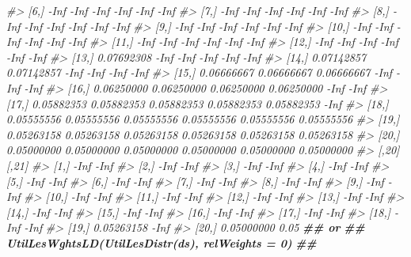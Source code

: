 \documentclass[
]{book}
\newenvironment{Shaded}{\begin{snugshade}}{\end{snugshade}}
\newcommand{\CommentTok}[1]{\textcolor[rgb]{0.56,0.35,0.01}{\textit{#1}}}
\newcommand{\DocumentationTok}[1]{\textcolor[rgb]{0.56,0.35,0.01}{\textbf{\textit{#1}}}}
\begin{document}
\begin{Shaded}
\begin{Highlighting}[]
\CommentTok{\#\textgreater{}  [6,]       {-}Inf       {-}Inf       {-}Inf       {-}Inf       {-}Inf       {-}Inf}
\CommentTok{\#\textgreater{}  [7,]       {-}Inf       {-}Inf       {-}Inf       {-}Inf       {-}Inf       {-}Inf}
\CommentTok{\#\textgreater{}  [8,]       {-}Inf       {-}Inf       {-}Inf       {-}Inf       {-}Inf       {-}Inf}
\CommentTok{\#\textgreater{}  [9,]       {-}Inf       {-}Inf       {-}Inf       {-}Inf       {-}Inf       {-}Inf}
\CommentTok{\#\textgreater{} [10,]       {-}Inf       {-}Inf       {-}Inf       {-}Inf       {-}Inf       {-}Inf}
\CommentTok{\#\textgreater{} [11,]       {-}Inf       {-}Inf       {-}Inf       {-}Inf       {-}Inf       {-}Inf}
\CommentTok{\#\textgreater{} [12,]       {-}Inf       {-}Inf       {-}Inf       {-}Inf       {-}Inf       {-}Inf}
\CommentTok{\#\textgreater{} [13,] 0.07692308       {-}Inf       {-}Inf       {-}Inf       {-}Inf       {-}Inf}
\CommentTok{\#\textgreater{} [14,] 0.07142857 0.07142857       {-}Inf       {-}Inf       {-}Inf       {-}Inf}
\CommentTok{\#\textgreater{} [15,] 0.06666667 0.06666667 0.06666667       {-}Inf       {-}Inf       {-}Inf}
\CommentTok{\#\textgreater{} [16,] 0.06250000 0.06250000 0.06250000 0.06250000       {-}Inf       {-}Inf}
\CommentTok{\#\textgreater{} [17,] 0.05882353 0.05882353 0.05882353 0.05882353 0.05882353       {-}Inf}
\CommentTok{\#\textgreater{} [18,] 0.05555556 0.05555556 0.05555556 0.05555556 0.05555556 0.05555556}
\CommentTok{\#\textgreater{} [19,] 0.05263158 0.05263158 0.05263158 0.05263158 0.05263158 0.05263158}
\CommentTok{\#\textgreater{} [20,] 0.05000000 0.05000000 0.05000000 0.05000000 0.05000000 0.05000000}
\CommentTok{\#\textgreater{}            [,20] [,21]}
\CommentTok{\#\textgreater{}  [1,]       {-}Inf  {-}Inf}
\CommentTok{\#\textgreater{}  [2,]       {-}Inf  {-}Inf}
\CommentTok{\#\textgreater{}  [3,]       {-}Inf  {-}Inf}
\CommentTok{\#\textgreater{}  [4,]       {-}Inf  {-}Inf}
\CommentTok{\#\textgreater{}  [5,]       {-}Inf  {-}Inf}
\CommentTok{\#\textgreater{}  [6,]       {-}Inf  {-}Inf}
\CommentTok{\#\textgreater{}  [7,]       {-}Inf  {-}Inf}
\CommentTok{\#\textgreater{}  [8,]       {-}Inf  {-}Inf}
\CommentTok{\#\textgreater{}  [9,]       {-}Inf  {-}Inf}
\CommentTok{\#\textgreater{} [10,]       {-}Inf  {-}Inf}
\CommentTok{\#\textgreater{} [11,]       {-}Inf  {-}Inf}
\CommentTok{\#\textgreater{} [12,]       {-}Inf  {-}Inf}
\CommentTok{\#\textgreater{} [13,]       {-}Inf  {-}Inf}
\CommentTok{\#\textgreater{} [14,]       {-}Inf  {-}Inf}
\CommentTok{\#\textgreater{} [15,]       {-}Inf  {-}Inf}
\CommentTok{\#\textgreater{} [16,]       {-}Inf  {-}Inf}
\CommentTok{\#\textgreater{} [17,]       {-}Inf  {-}Inf}
\CommentTok{\#\textgreater{} [18,]       {-}Inf  {-}Inf}
\CommentTok{\#\textgreater{} [19,] 0.05263158  {-}Inf}
\CommentTok{\#\textgreater{} [20,] 0.05000000  0.05}
\DocumentationTok{\#\# or }
\DocumentationTok{\#\# UtilLesWghtsLD(UtilLesDistr(ds), relWeights = 0)}
\DocumentationTok{\#\#}
\end{Highlighting}
\end{Shaded}
\end{document}
